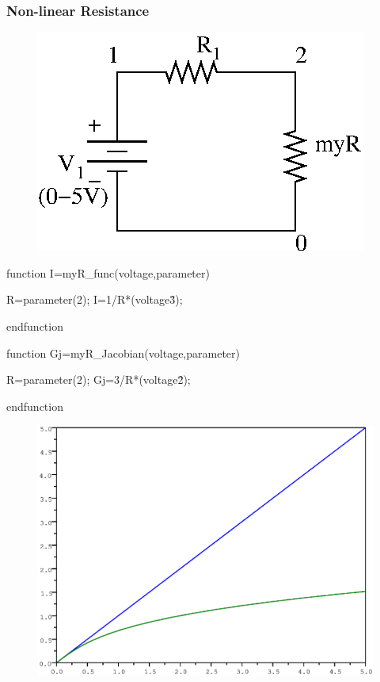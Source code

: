 \documentclass{beamer}
\begin{document}
\begin{frame}
\frametitle{Non-linear Resistance}
\begin{minipage}[!b]{0.43\linewidth} %
\begin{figure}[h]
\centering
\includegraphics[scale=0.7]{../figures/myR.eps}
\end{figure}
\begin{tiny}
function I=myR\_func(voltage,parameter)
\begin{center}
        R=parameter(2); \newline
        I=1/R*(voltage\^3);
\end{center}
endfunction \newline


function Gj=myR\_Jacobian(voltage,parameter) 
\begin{center}
        R=parameter(2); \newline
        Gj=3/R*(voltage\^2);
\end{center}
endfunction
\end{tiny}
\end{minipage}
\hspace{0.5cm} %
\begin{minipage}[!b]{0.5\linewidth} %
\begin{figure}[h]
\centering
\includegraphics[scale=0.3]{../figures/myROutput.eps}
\end{figure}
\end{minipage}
\end{frame}
\end{document}
